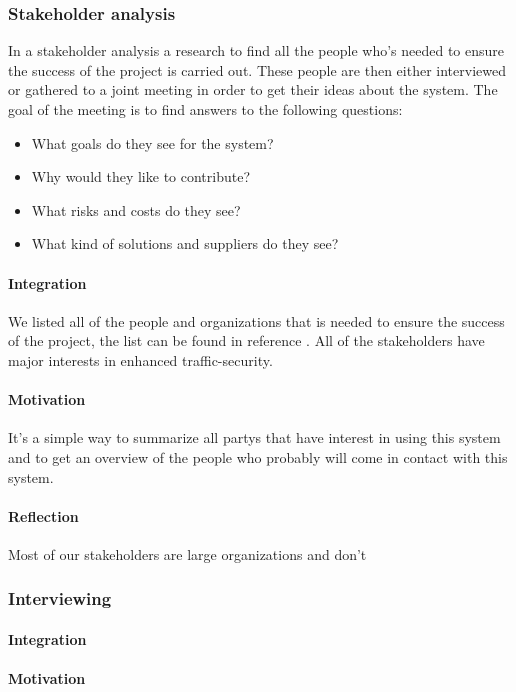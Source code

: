 \documentclass[10pt]{article}
\begin{document}
\subsubsection{Stakeholder analysis}
In a stakeholder analysis a research to find all the people who’s needed to ensure the success of the project is carried out. These people are then either interviewed or gathered to a joint meeting in order to get their ideas about the system. The goal of the meeting is to find answers to the following questions:
\begin{itemize}
\item What goals do they see for the system?
\item Why would they like to contribute?
\item What risks and costs do they see?
\item What kind of solutions and suppliers do they see?
\end{itemize}

\paragraph{Integration}
We listed all of the people and organizations that is needed to ensure the success of the project, the list can be found in reference \cite{pmv2}. All of the stakeholders have major interests in enhanced traffic-security.
\paragraph{Motivation}
It’s a simple way to summarize all partys that have interest in using this system and to get an overview of the people who probably will come in contact with this system.
\paragraph{Reflection}
Most of our stakeholders are large organizations and don’t


\subsubsection{Interviewing}
\paragraph{Integration}
\paragraph{Motivation}
\end{document}
